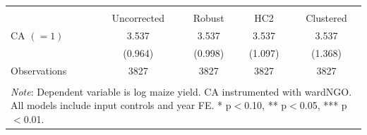 \begin{tabular}{l*{4}{c}} 
\\[-1.8ex]\hline \hline \\[-1.8ex] 
& \multicolumn{1}{c}{Uncorrected} & 
\multicolumn{1}{c}{Robust} & 
\multicolumn{1}{c}{HC2} & 
\multicolumn{1}{c}{Clustered} 
\\ \midrule
\midrule
\hspace{0.1cm} CA $(=1)$&       3.537\sym{***}&       3.537\sym{***}&       3.537\sym{***}&       3.537\sym{***}\\
                    &     (0.964)         &     (0.998)         &     (1.097)         &     (1.368)         \\
\midrule
Observations        &        3827         &        3827         &        3827         &        3827         \\
\hline \hline \\[-1.8ex] 
\multicolumn{5}{p{\linewidth}}{\small 
\noindent \textit{Note}: Dependent variable 
is log maize yield. CA instrumented with 
wardNGO. All models include input controls 
and year FE. 
* p$<$0.10, ** p$<$0.05, *** p$<$0.01.} 
\end{tabular}
